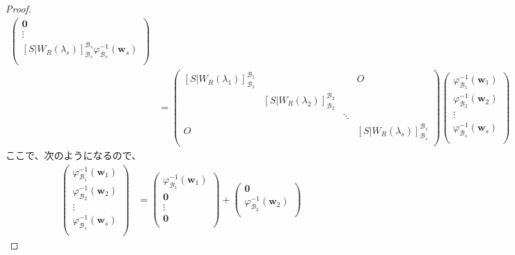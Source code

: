 \documentclass[dvipdfmx]{jsarticle}
\begin{document}
\begin{proof}
\begin{align*}
\begin{pmatrix}
\mathbf{0} \\
 \vdots \\
\left[S|W_{R}\left( \lambda_{s} \right) \right]_{\mathcal{B}_{s}}^{\mathcal{B}_{s}}\varphi_{\mathcal{B}_{s}}^{- 1}\left( \mathbf{w}_{s} \right) \\
\end{pmatrix} \\
&= \begin{pmatrix}
\left[S|W_{R}\left( \lambda_{1} \right) \right]_{\mathcal{B}_{1}}^{\mathcal{B}_{1}} & \  & \  & O \\
\  & \left[S|W_{R}\left( \lambda_{2} \right) \right]_{\mathcal{B}_{2}}^{\mathcal{B}_{2}} & \  & \  \\
\  & \  & \ddots & \  \\
O & \  & \  & \left[S|W_{R}\left( \lambda_{s} \right) \right]_{\mathcal{B}_{s}}^{\mathcal{B}_{s}} \\
\end{pmatrix}\begin{pmatrix}
\varphi_{\mathcal{B}_{1}}^{- 1}\left( \mathbf{w}_{1} \right) \\
\varphi_{\mathcal{B}_{2}}^{- 1}\left( \mathbf{w}_{2} \right) \\
 \vdots \\
\varphi_{\mathcal{B}_{s}}^{- 1}\left( \mathbf{w}_{s} \right) \\
\end{pmatrix}
\end{align*}
ここで、次のようになるので、
\begin{align*}
\begin{pmatrix}
\varphi_{\mathcal{B}_{1}}^{- 1}\left( \mathbf{w}_{1} \right) \\
\varphi_{\mathcal{B}_{2}}^{- 1}\left( \mathbf{w}_{2} \right) \\
 \vdots \\
\varphi_{\mathcal{B}_{s}}^{- 1}\left( \mathbf{w}_{s} \right) \\
\end{pmatrix} &= \begin{pmatrix}
\varphi_{\mathcal{B}_{1}}^{- 1}\left( \mathbf{w}_{1} \right) \\
\mathbf{0} \\
 \vdots \\
\mathbf{0} \\
\end{pmatrix} + \begin{pmatrix}
\mathbf{0} \\
\varphi_{\mathcal{B}_{2}}^{- 1}\left( \mathbf{w}_{2} \right) \\

\end{pmatrix}
\end{align*}
\end{proof}
\end{document}
